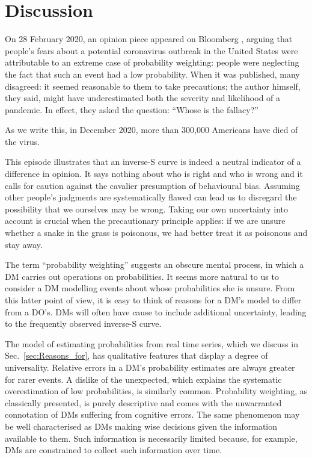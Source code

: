\documentclass[12pt,letter,timesnewroman]{article}
\newcommand{\secref}[1]{Sec.~\ref{sec:#1}}
\begin{document}

\section{Discussion}

On 28 February 2020, an opinion piece appeared on Bloomberg \parencite{Sunstein2020}, arguing that people's fears about a potential coronavirus outbreak in the United States were attributable to an extreme case of probability weighting: people were neglecting the fact that such an event had a low probability. When it was published, many disagreed: it seemed reasonable to them to take precautions; the author himself, they said, might have underestimated both the severity and likelihood of a pandemic. In effect, they asked the \textcite{Cohen1979a} question: ``Whose is the fallacy?''

As we write this, in December 2020, more than 300,000 Americans have died of the virus.

This episode illustrates that an inverse-S curve is indeed a neutral indicator of a difference in opinion. 
It says nothing about who is right and who is wrong and it calls for caution against the cavalier presumption of behavioural bias.
Assuming other people's judgments are systematically flawed can lead us to disregard the possibility that we ourselves may be wrong.
Taking our own uncertainty into account is crucial when the precautionary principle applies: if we are unsure whether a snake in the grass is poisonous, we had better treat it as poisonous and stay away.

The term ``probability weighting'' suggests an obscure mental process, in which a DM carries out operations on probabilities. It seems more natural to us to consider a DM modelling events about whose probabilities she is unsure. From this latter point of view, it is easy to think of reasons for a DM's model to differ from a DO's. DMs will often have cause to include additional uncertainty, leading to the frequently observed inverse-S curve.

The model of estimating probabilities from real time series, which we discuss in \secref{Reasons_for}, has qualitative features that display a degree of universality. Relative errors in a DM's probability estimates are always greater for rarer events. A dislike of the unexpected, which explains the systematic overestimation of low probabilities, is similarly common. Probability weighting, as classically presented, is purely descriptive and comes with the unwarranted connotation of DMs suffering from cognitive errors. The same phenomenon may be well characterised as DMs making wise decisions given the information available to them. Such information is necessarily limited because, for example, DMs are constrained to collect such information over time.
\end{document}
